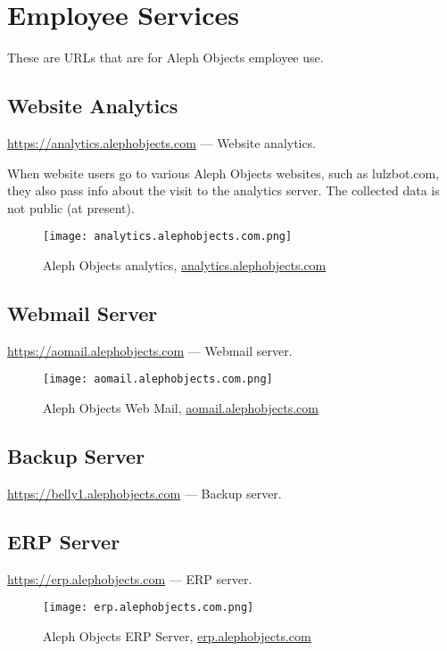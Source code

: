 %
%
%
%
%

\section{Employee Services}
These are URLs that are for Aleph Objects employee use.

\subsection{Website Analytics}
\url{https://analytics.alephobjects.com} --- Website analytics.

When website users go to various Aleph Objects websites, such as lulzbot.com,
they also pass info about the visit to the analytics server. The collected
data is not public (at present).

\begin{figure}[h!]
\texttt{[image: analytics.alephobjects.com.png]}
 \caption{Aleph Objects analytics, \href{analytics.alephobjects.com}{analytics.alephobjects.com}}
 \label{fig:analyticsalephobjectscom}
\end{figure}

\subsection{Webmail Server}
\url{https://aomail.alephobjects.com} --- Webmail server.
\begin{figure}[h!]
\texttt{[image: aomail.alephobjects.com.png]}
 \caption{Aleph Objects Web Mail, \href{aomail.alephobjects.com}{aomail.alephobjects.com}}
 \label{fig:aomailalephobjectscom}
\end{figure}

\subsection{Backup Server}
\url{https://belly1.alephobjects.com} --- Backup server.

\subsection{ERP Server}
\url{https://erp.alephobjects.com} --- ERP server.
\begin{figure}[h!]
\texttt{[image: erp.alephobjects.com.png]}
 \caption{Aleph Objects ERP Server, \href{erp.alephobjects.com}{erp.alephobjects.com}}
 \label{fig:erpalephobjectscom}
\end{figure}

